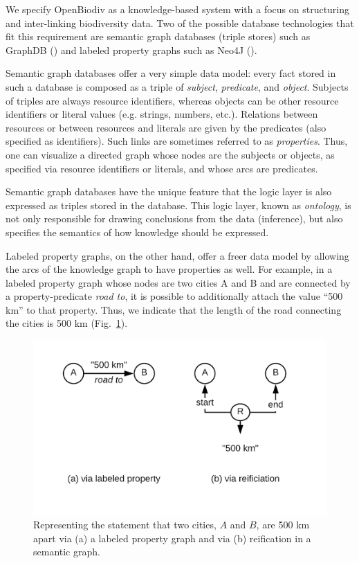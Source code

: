 We specify OpenBiodiv as a knowledge-based system with a focus on structuring and inter-linking biodiversity data. Two of the possible database technologies that fit this requirement are semantic graph databases (triple stores) such as GraphDB (\cite{ontotext_graphdb_2018}) and labeled property graphs such as Neo4J (\cite{neo4j_developers_neo4j_2012}).

Semantic graph databases offer a very simple data model: every fact stored in such a database is composed as a triple of \emph{subject}, \emph{predicate}, and \emph{object}. Subjects of triples are always resource identifiers, whereas objects can be other resource identifiers or literal values (e.g. strings, numbers, etc.). Relations between resources or between resources and literals are given by the predicates (also specified as identifiers). Such links are sometimes referred to as \emph{properties}. Thus, one can visualize a directed graph whose nodes are the subjects or objects, as specified via resource identifiers or literals, and whose arcs are predicates.

Semantic graph databases have the unique feature that the logic layer is also expressed as triples stored in the database. This logic layer, known as \emph{ontology}, is not only responsible for drawing conclusions from the data (inference), but also specifies the semantics of how knowledge should be expressed.

Labeled property graphs, on the other hand, offer a freer data model by allowing the arcs of the knowledge graph to have properties as well. For example, in a labeled property graph whose nodes are two cities A and B and are connected by a property-predicate \emph{road to}, it is possible to additionally attach the value ``500 km'' to that property. Thus, we indicate that the length of the road connecting the cities is 500 km (Fig.~\ref{fig-ab}).

\begin{figure}[h!]
	\centering
	\includegraphics[width=\textwidth]{Figures/ab}
	\decoRule
  \caption{Representing the statement that two cities, $A$ and $B$, are 500 km apart via (a) a labeled property graph and via (b) reification in a semantic graph.}
  \label{fig-ab}
\end{figure}


